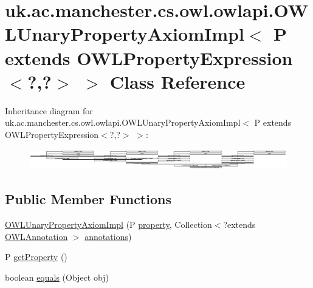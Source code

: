 \hypertarget{classuk_1_1ac_1_1manchester_1_1cs_1_1owl_1_1owlapi_1_1_o_w_l_unary_property_axiom_impl_3_01_p_01ef205cf0db3dbc15b2d1991298cd49c2}{\section{uk.\-ac.\-manchester.\-cs.\-owl.\-owlapi.\-O\-W\-L\-Unary\-Property\-Axiom\-Impl$<$ P extends O\-W\-L\-Property\-Expression$<$?,?$>$ $>$ Class Reference}
\label{classuk_1_1ac_1_1manchester_1_1cs_1_1owl_1_1owlapi_1_1_o_w_l_unary_property_axiom_impl_3_01_p_01ef205cf0db3dbc15b2d1991298cd49c2}
}
Inheritance diagram for uk.\-ac.\-manchester.\-cs.\-owl.\-owlapi.\-O\-W\-L\-Unary\-Property\-Axiom\-Impl$<$ P extends O\-W\-L\-Property\-Expression$<$?,?$>$ $>$\-:\begin{figure}[H]
\begin{center}
\leavevmode
\includegraphics[height=0.893142cm]{classuk_1_1ac_1_1manchester_1_1cs_1_1owl_1_1owlapi_1_1_o_w_l_unary_property_axiom_impl_3_01_p_01ef205cf0db3dbc15b2d1991298cd49c2}
\end{center}
\end{figure}
\subsection*{Public Member Functions}
\begin{DoxyCompactItemize}
\item 
\hyperlink{classuk_1_1ac_1_1manchester_1_1cs_1_1owl_1_1owlapi_1_1_o_w_l_unary_property_axiom_impl_3_01_p_01ef205cf0db3dbc15b2d1991298cd49c2_ad37dd68fbd094fba2f31488fe3e730af}{O\-W\-L\-Unary\-Property\-Axiom\-Impl} (P \hyperlink{classuk_1_1ac_1_1manchester_1_1cs_1_1owl_1_1owlapi_1_1_o_w_l_unary_property_axiom_impl_3_01_p_01ef205cf0db3dbc15b2d1991298cd49c2_a3bd6535955e3be7c7a578387020bc32f}{property}, Collection$<$?extends \hyperlink{interfaceorg_1_1semanticweb_1_1owlapi_1_1model_1_1_o_w_l_annotation}{O\-W\-L\-Annotation} $>$ \hyperlink{classuk_1_1ac_1_1manchester_1_1cs_1_1owl_1_1owlapi_1_1_o_w_l_axiom_impl_af6fbf6188f7bdcdc6bef5766feed695e}{annotations})
\item 
P \hyperlink{classuk_1_1ac_1_1manchester_1_1cs_1_1owl_1_1owlapi_1_1_o_w_l_unary_property_axiom_impl_3_01_p_01ef205cf0db3dbc15b2d1991298cd49c2_a98a1d8e7731d7f0e4ae5c888ab2f0f9a}{get\-Property} ()
\item 
boolean \hyperlink{classuk_1_1ac_1_1manchester_1_1cs_1_1owl_1_1owlapi_1_1_o_w_l_unary_property_axiom_impl_3_01_p_01ef205cf0db3dbc15b2d1991298cd49c2_a158688eda5c87eafbf5ebccdfa535d35}{equals} (Object obj)
\end{DoxyCompactItemize}
